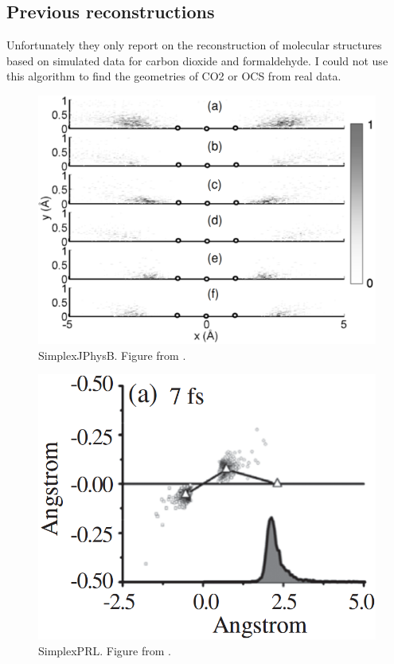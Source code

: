 \subsection{Previous reconstructions}
Unfortunately they only report on the reconstruction of molecular structures based on simulated data for carbon dioxide and formaldehyde. I could not use this algorithm to find the geometries of CO2 or OCS from real data.

\pagebreak
\begin{figure}
  \centering
  \includegraphics[width=\textwidth]{gfx/SimplexJPhysB}
  \caption[SimplexJPhysB.]
  {SimplexJPhysB. Figure from \citet{Brichta07}.}
  \label{fig:simplexJPhysB}
\end{figure}
\clearpage

\pagebreak
\begin{figure}
  \centering
  \includegraphics[width=\textwidth]{gfx/SimplexPRL}
  \caption[SimplexPRL.]
  {SimplexPRL. Figure from \citet{Bocharova11}.}
  \label{fig:simplexPRL}
\end{figure}
\clearpage

